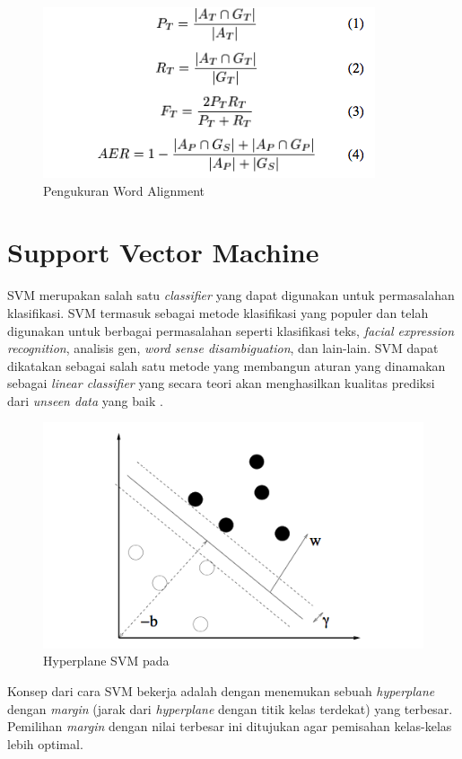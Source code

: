 \begin{figure}
	\centering
	\includegraphics[width=1\linewidth]{adit_pics/Pengukuran-Word-Alignment}
	\caption{Pengukuran Word Alignment}
	\label{fig:Pengukuran-Word-Alignment}
\end{figure}

\section{Support Vector Machine}
SVM merupakan salah satu \textit{classifier} yang dapat digunakan untuk permasalahan klasifikasi. SVM termasuk sebagai metode klasifikasi yang populer dan telah digunakan untuk berbagai permasalahan seperti klasifikasi teks, \textit{facial expression recognition}, analisis gen, \textit{word sense disambiguation}, dan lain-lain. SVM dapat dikatakan sebagai salah satu metode yang membangun aturan yang dinamakan sebagai \textit{linear classifier} yang secara teori akan menghasilkan kualitas prediksi dari \textit{unseen data} yang baik \citep{fradkin2006support}.

\begin{figure}
	\centering
	\includegraphics[width=1\linewidth]{adit_pics/svm-hyperplane}
	\caption{Hyperplane SVM pada \citep{fradkin2006support}}
	\label{fig:svm}
\end{figure}

Konsep dari cara SVM bekerja adalah dengan menemukan sebuah \textit{hyperplane} dengan \textit{margin} (jarak dari \textit{hyperplane} dengan titik kelas terdekat) yang terbesar. Pemilihan \textit{margin} dengan nilai terbesar ini ditujukan agar pemisahan kelas-kelas lebih optimal.